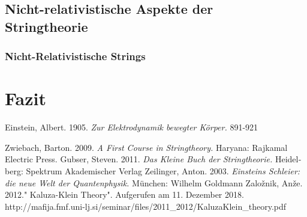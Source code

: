 \documentclass[a4paper,11pt]{article}
\begin{document}
\subsection{Nicht-relativistische Aspekte der \\ Stringtheorie}

\subsubsection{Nicht-Relativistische Strings}

\newpage
\section{Fazit}
\newpage

\begin{otherlanguage}{ngerman}

\begin{thebibliography}{9}

Einstein, Albert. 1905. 
\textit{Zur Elektrodynamik bewegter Körper.}
891-921

Zwiebach, Barton. 2009.
\textit{A First Course in Stringtheory.}
Haryana: Rajkamal Electric Press.
Gubser, Steven. 2011. 
\textit{Das Kleine Buch der Stringtheorie.}
Heidelberg: Spektrum Akademischer Verlag
Zeilinger, Anton. 2003.
\textit{Einsteins Schleier: die neue Welt der Quantenphysik.}
München: Wilhelm Goldmann
Zalo\v{z}nik, An\v{z}e. 2012." Kaluza-Klein Theory". Aufgerufen am 11. Dezember 2018.\\
http://mafija.fmf.uni-lj.si/seminar/files/2011\_2012/KaluzaKlein\_theory.pdf
\end{thebibliography}
\end{otherlanguage}
\end{document}
